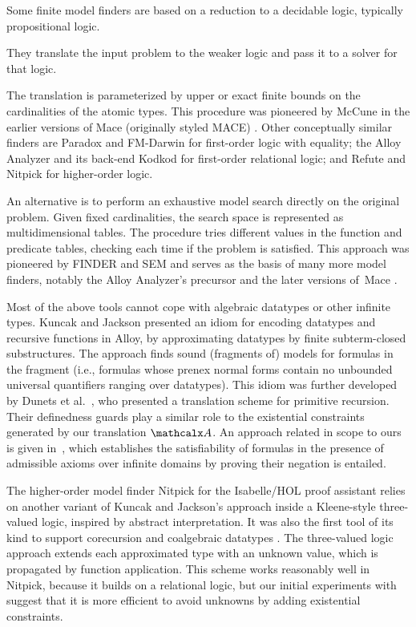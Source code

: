 Some finite model finders are based on a reduction to a decidable logic,
typically propositional logic. \begin{rep}They translate the input problem to the weaker
logic and pass it to a solver for that logic.\end{rep}
The translation is parameterized by upper or exact finite bounds on
the cardinalities of the atomic types. This procedure was pioneered by McCune
in the earlier versions of Mace (originally styled MACE) \cite{mccune-1994}.
Other conceptually similar finders are Paradox \cite{claessen-sorensson-2003}
and FM-Darwin \cite{baumgartner-et-al-2009} for first-order logic with
equality; the Alloy Analyzer and its back-end Kodkod \cite{torlak-jackson-2007}
for first-order relational logic; and Refute \cite{weber-2008} and Nitpick
\cite{blanchette-nipkow-2010} for higher-order logic.

An alternative is to perform
an exhaustive model search directly on the original problem. Given fixed
cardinalities, the search space is represented as multidimensional
tables. The procedure tries different values in the function and predicate
tables, checking each time if the problem is satisfied.
This approach was pioneered by FINDER
\cite{slaney-1994} and SEM \cite{zhang-zhang-1995} and serves as
the basis of many more model finders, notably the Alloy Analyzer's precursor
\cite{jackson-1996} and the later versions of~Mace
\cite{mccune-prover9-mace4}.

Most of the above tools cannot cope with algebraic datatypes or other infinite
types.
Kuncak and Jackson \cite{kuncak-jackson-2005} presented an idiom for
encoding datatypes and recursive functions in Alloy, by approximating datatypes
by finite subterm-closed substructures. The approach finds sound (fragments
of) models for formulas in the  fragment%
(i.e., formulas whose prenex normal forms contain no unbounded universal
quantifiers ranging over datatypes). This idiom was further developed by Dunets
et al.\ \cite{dunets-et-al-2010}, who presented a translation scheme
for primitive recursion. Their definedness guards play a similar role to the
existential constraints generated by our translation $\conv$.
An approach related in scope to ours is given in~\cite{baumgartner2013},
which establishes the satisfiability of formulas in the presence of admissible
axioms over infinite domains by proving their negation is entailed.

The higher-order model finder Nitpick \cite{blanchette-nipkow-2010}
for the Isabelle/HOL proof assistant
relies on another variant of Kuncak and Jackson's approach inside a
Kleene-style three-valued logic, inspired by abstract interpretation.
It was also the first tool of its kind to support corecursion and
coalgebraic datatypes \cite{blanchette-2013-relational}.
The three-valued logic approach extends each
approximated type with an unknown value, which is propagated by function
application. This scheme works reasonably well in Nitpick, because it builds
on a relational logic, but our initial experiments with \cvc suggest
that it is more efficient to avoid unknowns by adding existential
constraints.

